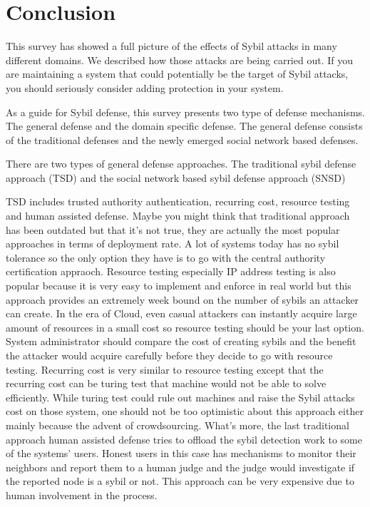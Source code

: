 \documentclass[conference]{IEEEtran}
\begin{document}
\section{Conclusion} \label{Conclusion}
This survey has showed a full picture of the effects of Sybil attacks in many different domains. We described how those attacks are being carried out. If you are maintaining a system that could potentially be the target of Sybil attacks, you should seriously consider adding protection in your system. 

As a guide for Sybil defense, this survey presents two type of defense mechanisms.  The general defense and the domain specific defense. The general defense consists of the traditional defenses and the newly emerged social network based defenses. 

There are two types of general defense approaches. The traditional sybil defense approach (TSD) and the social network based sybil defense approach (SNSD)

TSD includes trusted authority authentication, recurring cost, resource testing and human assisted defense. Maybe you might think that traditional approach has been outdated but that it's not true, they are actually the most popular approaches in terms of deployment rate. A lot of systems today has no sybil tolerance so the only option they have is to go with the central authority certification appraoch. Resource testing especially IP address testing is also popular because it is very easy to implement and enforce in real world but this approach provides an extremely week bound on the number of sybils an attacker can create. In the era of Cloud, even casual attackers can instantly acquire large amount of resources in a small cost so resource testing should be your last option. System administrator should compare the cost of creating sybils and the benefit the attacker would acquire carefully before they decide to go with resource testing. Recurring cost is very similar to resource testing except that the recurring cost can be turing test that machine would not be able to solve efficiently. While turing test could rule out machines and raise the Sybil attacks cost on those system, one should not be too optimistic about this approach either mainly because the advent of crowdsourcing. What's more, the last traditional approach human assisted defense tries to offload the sybil detection work to some of the systems' users. Honest users in this case has mechanisms to monitor their neighbors and report them to a human judge and the judge would investigate if the reported node is a sybil or not. This approach can be very expensive due to human involvement in the process.
\end{document}

